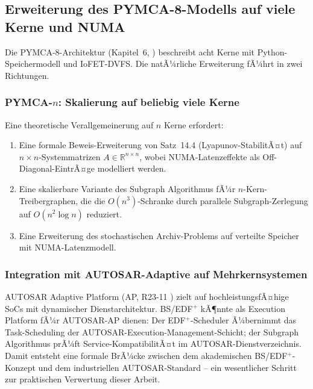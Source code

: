 ﻿\documentclass[a4paper,12pt]{scrreprt}
\theoremstyle{definition}
\begin{document}
	\subsection{Erweiterung des PYMCA-8-Modells auf viele Kerne und NUMA}
	
	Die PYMCA-8-Architektur (Kapitel~6, \cite{Epp2026pymca8}) beschreibt
	acht Kerne mit Python-Speicher\-modell und IoFET-DVFS. Die natÃ¼rliche
	Erweiterung fÃ¼hrt in zwei Richtungen.
	
	\subsubsection{PYMCA-$n$: Skalierung auf beliebig viele Kerne}
	
	Eine theoretische Verallgemeinerung auf $n$ Kerne erfordert:
	
	\begin{enumerate}
		\item Eine formale Beweis-Erweiterung von Satz~14.4 (Lyapunov-StabilitÃ¤t)
		auf $n \times n$-Systemmatrizen $A \in \mathbb{R}^{n \times n}$, wobei
		NUMA-Latenzeffekte als Off-Diagonal-EintrÃ¤ge modelliert werden.
		\item Eine skalierbare Variante des Subgraph Algorithmus
		\cite{Epp2026subgraph} fÃ¼r $n$-Kern-Treibergraphen, die die
		$O(n^3)$-Schranke durch parallele Subgraph-Zerlegung auf
		$O(n^2 \log n)$ reduziert.
		\item Eine Erweiterung des stochastischen Archiv-Problems
		\cite{Epp2026archv} auf verteilte Speicher mit NUMA-Latenzmodell.
	\end{enumerate}
	
	\subsubsection{Integration mit AUTOSAR-Adaptive auf Mehrkernsystemen}
	
	AUTOSAR Adaptive Platform (AP, R23-11 \cite{AUTOSAR2023}) zielt auf
	hochleistungsfÃ¤hige SoCs mit dynamischer Dienstarchitektur.
	BS/EDF$^+$ kÃ¶nnte als Execution Platform fÃ¼r AUTOSAR-AP dienen:
	Der EDF$^+$-Scheduler Ã¼bernimmt das Task-Scheduling der
	AUTOSAR-Execution-Management-Schicht; der Subgraph Algorithmus
	prÃ¼ft Service-KompatibilitÃ¤t im AUTO\-SAR-Dienstverzeichnis.
	Damit entsteht eine formale BrÃ¼cke zwischen dem akademischen
	BS/EDF$^+$-Konzept und dem industriellen AUTOSAR-Standard --
	ein wesentlicher Schritt zur praktischen Verwertung dieser Arbeit.
	
\end{document}
